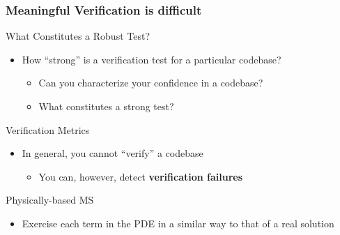 \documentclass[mathserif]{beamer}
\begin{document}
\begin{frame}
  \frametitle{Meaningful Verification is difficult}

 \begin{block}{What Constitutes a Robust Test?}
  \begin{itemize}
   \item How ``strong'' is a verification test for a particular codebase?
	 \begin{itemize}
	  \item Can you characterize your confidence in a codebase?
	  \item What constitutes a strong test?
	 \end{itemize} 
  \end{itemize}
 \end{block}

 \begin{block}{Verification Metrics}
  \begin{itemize}
   \item In general, you cannot ``verify'' a codebase
   \begin{itemize}
    \item You can, however, detect {\bf verification failures}
   \end{itemize}
  \end{itemize}
 \end{block}

  \begin{block}{Physically-based MS}
   \begin{itemize}	   
    \item Exercise each term in the PDE in a similar way to that of a
	  real solution	
   \end{itemize}
  \end{block}

\end{frame}
\end{document}
